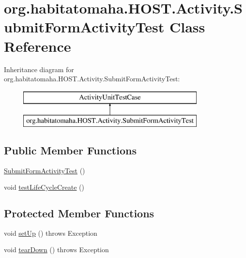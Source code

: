 \hypertarget{classorg_1_1habitatomaha_1_1_h_o_s_t_1_1_activity_1_1_submit_form_activity_test}{\section{org.\-habitatomaha.\-H\-O\-S\-T.\-Activity.\-Submit\-Form\-Activity\-Test Class Reference}
\label{classorg_1_1habitatomaha_1_1_h_o_s_t_1_1_activity_1_1_submit_form_activity_test}
}
Inheritance diagram for org.\-habitatomaha.\-H\-O\-S\-T.\-Activity.\-Submit\-Form\-Activity\-Test\-:\begin{figure}[H]
\begin{center}
\leavevmode
\includegraphics[height=2.000000cm]{classorg_1_1habitatomaha_1_1_h_o_s_t_1_1_activity_1_1_submit_form_activity_test}
\end{center}
\end{figure}
\subsection*{Public Member Functions}
\begin{DoxyCompactItemize}
\item 
\hyperlink{classorg_1_1habitatomaha_1_1_h_o_s_t_1_1_activity_1_1_submit_form_activity_test_acbb130572a8cf5c80a037958e5225a1a}{Submit\-Form\-Activity\-Test} ()
\item 
void \hyperlink{classorg_1_1habitatomaha_1_1_h_o_s_t_1_1_activity_1_1_submit_form_activity_test_ab5d5f6b4c161ad37a4548fc19a82e1b5}{test\-Life\-Cycle\-Create} ()
\end{DoxyCompactItemize}
\subsection*{Protected Member Functions}
\begin{DoxyCompactItemize}
\item 
void \hyperlink{classorg_1_1habitatomaha_1_1_h_o_s_t_1_1_activity_1_1_submit_form_activity_test_a76b52475256cd3465965d9a07d10668d}{set\-Up} ()  throws Exception 
\item 
void \hyperlink{classorg_1_1habitatomaha_1_1_h_o_s_t_1_1_activity_1_1_submit_form_activity_test_a8c5da29be5109dbff7f0ead4eae990dd}{tear\-Down} ()  throws Exception
\end{DoxyCompactItemize}


